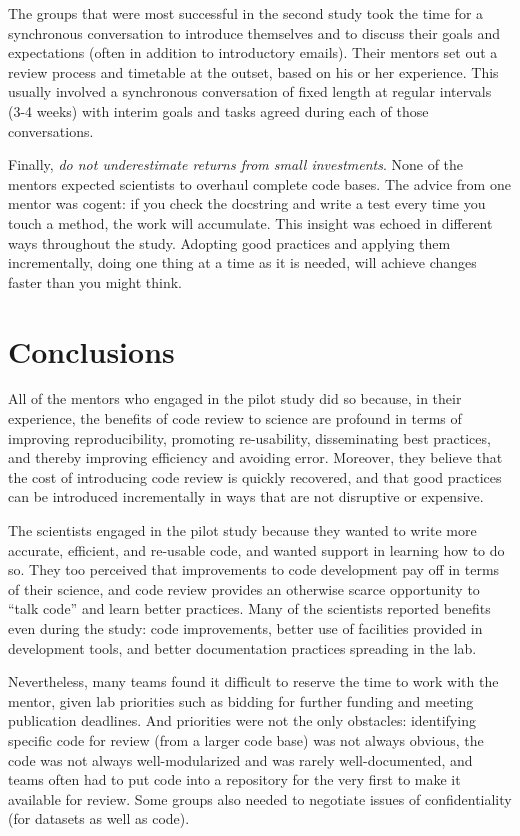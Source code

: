 \documentclass[10pt,twocolumn]{article}
\begin{document}
The groups that were most successful in the second study
took the time for a synchronous conversation to introduce themselves and to discuss their goals and expectations
(often in addition to introductory emails).
Their mentors set out a review process and timetable at the outset,
based on his or her experience.
This usually involved a synchronous conversation of fixed length at regular intervals (3-4 weeks)
with interim goals and tasks agreed during each of those conversations.

Finally,
\emph{do not underestimate returns from small investments}.
None of the mentors expected scientists to overhaul complete code bases.
The advice from one mentor was cogent:
if you check the docstring and write a test every time you touch a method,
the work will accumulate.
This insight was echoed in different ways throughout the study.
Adopting good practices and applying them incrementally,
doing one thing at a time as it is needed,
will achieve changes faster than you might think.

\section{Conclusions}

All of the mentors who engaged in the pilot study did so because,
in their experience,
the benefits of code review to science are profound in terms of improving reproducibility,
promoting re-usability,
disseminating best practices,
and thereby improving efficiency and avoiding error.
Moreover,
they believe that the cost of introducing code review is quickly recovered,
and that good practices can be introduced incrementally in ways that are not disruptive or expensive.  

The scientists engaged in the pilot study because they wanted to write more accurate, efficient, and re-usable code,
and wanted support in learning how to do so.
They too perceived that improvements to code development pay off in terms of their science,
and code review provides an otherwise scarce opportunity to ``talk code'' and learn better practices.
Many of the scientists reported benefits even during the study:
code improvements,
better use of facilities provided in development tools,
and better documentation practices spreading in the lab.  

Nevertheless,
many teams found it difficult to reserve the time to work with the mentor,
given lab priorities such as bidding for further funding and meeting publication deadlines.
And priorities were not the only obstacles:
identifying specific code for review (from a larger code base) was not always obvious,
the code was not always well-modularized and was rarely well-documented,
and teams often had to put code into a repository for the very first to make it available for review.
Some groups also needed to negotiate issues of confidentiality (for datasets as well as code).
\end{document}
